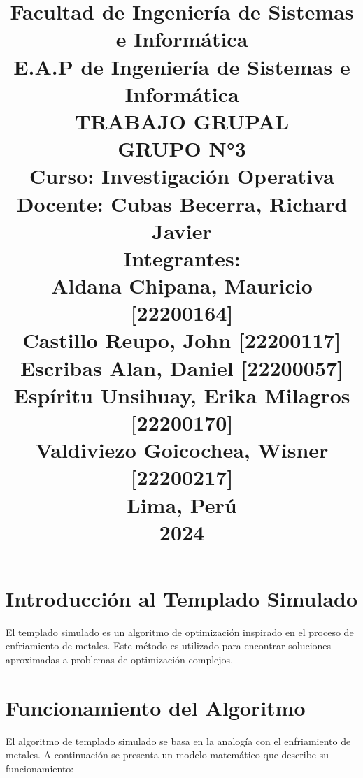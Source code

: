 \documentclass{article}
\begin{document}
\title{
Facultad de Ingeniería de Sistemas e Informática\\
E.A.P de Ingeniería de Sistemas e Informática\\
\vspace{1cm}
TRABAJO GRUPAL\\
\vspace{1cm}
GRUPO N°3\\
\vspace{1cm}
Curso: Investigación Operativa\\
Docente: Cubas Becerra, Richard Javier\\
\vspace{1cm}
Integrantes:\\
Aldana Chipana, Mauricio \hfill [22200164]\\
Castillo Reupo, John \hfill [22200117]\\
Escribas Alan, Daniel \hfill [22200057]\\
Espíritu Unsihuay, Erika Milagros \hfill [22200170]\\
Valdiviezo Goicochea, Wisner \hfill [22200217]\\
\vspace{1cm}
Lima, Perú\\
2024
}
\date{}

\maketitle
\newpage %

\tableofcontents %
\newpage %

\section{Introducción al Templado Simulado}
El templado simulado es un algoritmo de optimización inspirado en el proceso de enfriamiento de metales. Este método es utilizado para encontrar soluciones aproximadas a problemas de optimización complejos.

\section{Funcionamiento del Algoritmo}
El algoritmo de templado simulado se basa en la analogía con el enfriamiento de metales. A continuación se presenta un modelo matemático que describe su funcionamiento:
\end{document}
